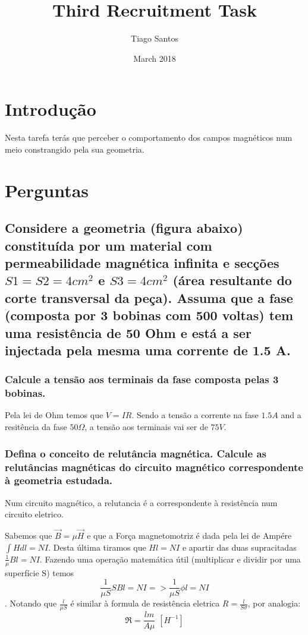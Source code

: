 \documentclass{article}
\begin{document}
\title{\textbf{Third Recruitment Task}}
\author{Tiago Santos}
\date{March 2018}
\maketitle
\section{Introdução}
Nesta tarefa terás que perceber o comportamento dos campos magnéticos num meio constrangido pela sua geometria.

\section{Perguntas}
\subsection{Considere a geometria (figura abaixo) constituída por um material com permeabilidade magnética infinita e secções $S1 = S2 = 4 cm^2$ e $S3 = 4 cm^2$ (área resultante do corte transversal da peça). Assuma que a fase (composta por 3 bobinas com 500 voltas) tem uma resistência de 50 Ohm e está a ser injectada pela mesma uma corrente de 1.5 A.}

\subsubsection{Calcule a tensão aos terminais da fase composta pelas 3 bobinas.} 
Pela lei de Ohm temos que $V=IR$. Sendo a tensão a corrente na fase $1.5 A$ and a resitência da fase $50 \Omega$, a tensão aos terminais vai ser de $75V$.
\subsubsection{Defina o conceito de relutância magnética. Calcule as relutâncias magnéticas do circuito magnético correspondente à geometria estudada.}
Num circuito magnético, a relutancia é a correspondente à resistência num circuito eletrico.

Sabemos que $\vec{B}=\mu \vec{H}$ e que a Força magnetomotriz é dada pela lei de Ampére $\int Hdl = NI$. Desta última tiramos que $Hl = NI$ e apartir das duas supracitadas $\frac{1}{\mu} Bl = NI$. Fazendo uma operação matemática útil (multiplicar e dividir por uma superfície S) temos $$\frac{1}{\mu S} SBl = NI => \frac{1}{\mu S} \phi l = NI$$ . 
Notando que $\frac{l}{\mu S}$ é similar à formula de resistência eletrica $R = \frac{l}{S \sigma}$, por analogia: $$\Re = \frac{lm}{A \mu}\, \, [H^{-1}]$$
\end{document}
